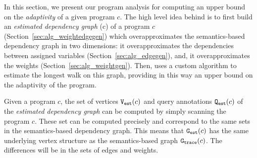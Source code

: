 In this section, we present our program analysis {\THESYSTEM} for
computing an upper bound on the \emph{adaptivity} of a given program
$c$.  The high level idea behind {\THESYSTEM} is to first build
an \emph{estimated dependency graph} \progG(c) of a program $c$
(Section~\ref{sec:alg_weightedgegen}) which overapproximates the
semantics-based dependency graph in two dimensions: it
overapproximates the dependencies between assigned variables (Section~\ref{sec:alg_edgegen}), and, it
overapproximates the weights (Section~\ref{sec:alg_weightgen}). Then, {\THESYSTEM} uses a custom algorithm to estimate the longest
walk on this graph, providing in this way an upper bound on the adaptivity of the
program.

Given a program $c$, the set of vertices $\mathtt{{V_{est}}}(c)$ and query annotations $\mathtt{{Q_{est}}}(c)$ of the \emph{estimated dependency graph} can be computed by simply
scanning the program $c$. These set can be computed precisely and correspond to
the same sets in the semantics-based dependency graph.
This means that $\mathtt{{G_{est}}}(c)$ has the same underlying vertex structure as 
the semantics-based graph $\mathtt{{G_{trace}}}(c)$. The differences will be in the sets of edges and weights. 

%
